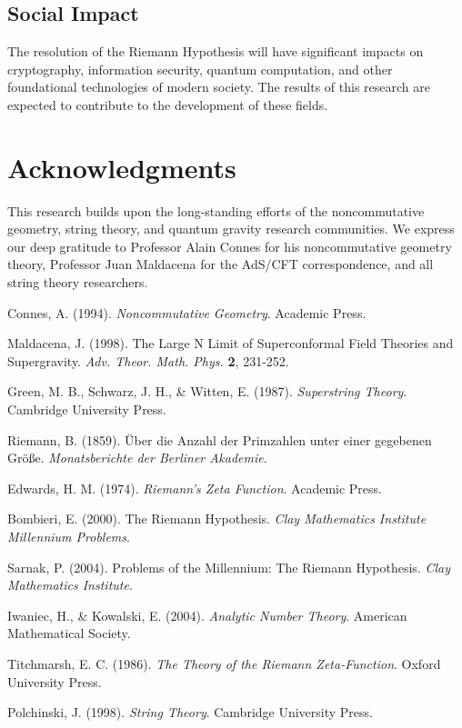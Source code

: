 \documentclass[12pt]{article}
\begin{document}
\subsection{Social Impact}

The resolution of the Riemann Hypothesis will have significant impacts on cryptography, information security, quantum computation, and other foundational technologies of modern society. The results of this research are expected to contribute to the development of these fields.

\section*{Acknowledgments}

This research builds upon the long-standing efforts of the noncommutative geometry, string theory, and quantum gravity research communities. We express our deep gratitude to Professor Alain Connes for his noncommutative geometry theory, Professor Juan Maldacena for the AdS/CFT correspondence, and all string theory researchers.

\begin{thebibliography}{99}

Connes, A. (1994). \textit{Noncommutative Geometry}. Academic Press.

Maldacena, J. (1998). The Large N Limit of Superconformal Field Theories and Supergravity. \textit{Adv. Theor. Math. Phys.} \textbf{2}, 231-252.

Green, M. B., Schwarz, J. H., \& Witten, E. (1987). \textit{Superstring Theory}. Cambridge University Press.

Riemann, B. (1859). Über die Anzahl der Primzahlen unter einer gegebenen Größe. \textit{Monatsberichte der Berliner Akademie}.

Edwards, H. M. (1974). \textit{Riemann's Zeta Function}. Academic Press.

Bombieri, E. (2000). The Riemann Hypothesis. \textit{Clay Mathematics Institute Millennium Problems}.

Sarnak, P. (2004). Problems of the Millennium: The Riemann Hypothesis. \textit{Clay Mathematics Institute}.

Iwaniec, H., \& Kowalski, E. (2004). \textit{Analytic Number Theory}. American Mathematical Society.

Titchmarsh, E. C. (1986). \textit{The Theory of the Riemann Zeta-Function}. Oxford University Press.

Polchinski, J. (1998). \textit{String Theory}. Cambridge University Press.

\end{thebibliography}
\end{document}
